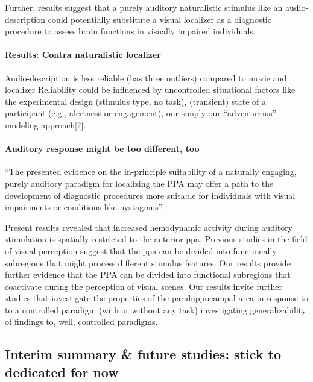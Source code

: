 Further, results suggest that a purely auditory naturalistic stimulus like an
audio-description could potentially substitute a visual localizer as a
diagnostic procedure to assess brain functions in visually impaired individuals.


\paragraph{Results: Contra naturalistic localizer}



Audio-description is less reliable (has three outliers) compared to movie and
localizer
%
Reliability could be influenced by uncontrolled situational factors like the
experimental design (stimulus type, no task), (transient) state of a participant
(e.g., alertness or engagement),  our simply our ``adventurous'' modeling
approach[?].


\paragraph{Auditory response might be too different, too}

%
``The presented evidence on the in-principle suitability of a naturally
engaging, purely auditory paradigm for localizing the PPA may offer a path to
the development of diagnostic procedures more suitable for individuals with
visual impairments or conditions like nystagmus''
\citep{haeusler2022processing}.

%
Present results revealed that increased hemodynamic activity during auditory
stimulation is spatially restricted to the anterior \ac{ppa}.
Previous studies in the field of visual perception suggest that the \ac{ppa} can
be divided into functionally subregions that might process different stimulus
features.
Our results provide further evidence that the PPA can be divided into functional
subregions that coactivate during the perception of visual scenes.
%
Our results invite further studies that investigate the properties of the
parahippocampal area in response to to a controlled paradigm (with or without
any task) investigating generalizability of findings to, well, controlled
paradigms.


\subsection{Interim summary \& future studies: stick to dedicated for now}

